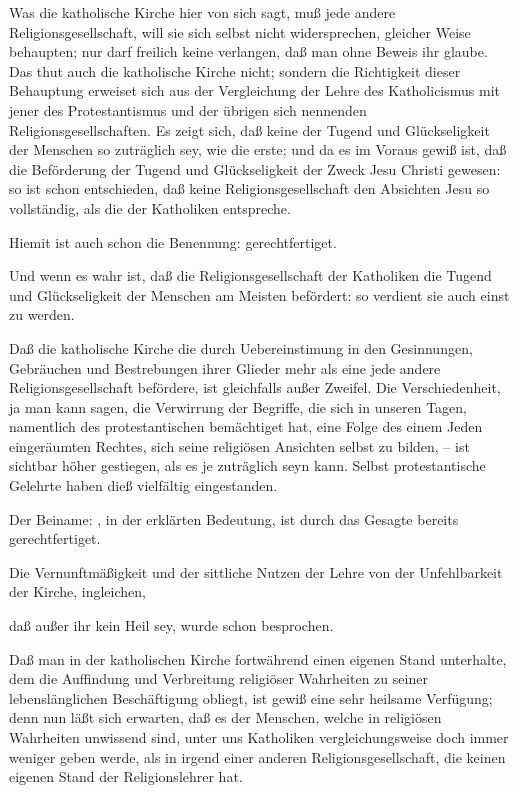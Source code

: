 \begin{aufza}
\item Was die katholische Kirche hier von sich sagt, muß jede andere Religionsgesellschaft, will sie sich selbst nicht widersprechen, gleicher Weise behaupten; nur darf freilich keine verlangen, daß man ohne Beweis ihr glaube. Das thut auch die katholische Kirche nicht; sondern die Richtigkeit dieser Behauptung erweiset sich aus der Vergleichung der Lehre des Katholicismus mit jener des Protestantismus und der übrigen  sich nennenden Religionsgesellschaften. Es zeigt sich, daß keine der Tugend und Glückseligkeit der Menschen so zuträglich sey, wie die erste; und da es im Voraus gewiß ist, daß die Beförderung der Tugend und Glückseligkeit der Zweck Jesu Christi gewesen: so ist schon entschieden, daß keine Religionsgesellschaft den Absichten Jesu so vollständig, als die der Katholiken entspreche.
\item Hiemit ist auch schon die Benennung:  gerechtfertiget.
\item Und wenn es wahr ist, daß die Religionsgesellschaft der Katholiken die Tugend und Glückseligkeit der Menschen am Meisten befördert: so verdient sie auch einst  zu werden.
\item Daß die katholische Kirche die  durch Uebereinstimung in den Gesinnungen, Gebräuchen und Bestrebungen ihrer Glieder mehr als eine jede andere Religionsgesellschaft befördere, ist gleichfalls außer Zweifel. Die Verschiedenheit, ja man kann sagen, die Verwirrung der Begriffe, die sich in unseren Tagen, namentlich des protestantischen  bemächtiget hat, eine Folge des einem Jeden eingeräumten Rechtes, sich seine religiösen Ansichten selbst zu bilden, -- ist sichtbar höher gestiegen, als es je zuträglich seyn kann. Selbst protestantische Gelehrte haben dieß vielfältig eingestanden.
\item Der Beiname: , in der erklärten Bedeutung, ist durch das Gesagte bereits gerechtfertiget.~
\item Die Vernunftmäßigkeit und der sittliche Nutzen der Lehre von der Unfehlbarkeit der Kirche, ingleichen,
\item daß außer ihr kein Heil sey, wurde schon besprochen.
\item Daß man in der katholischen Kirche fortwährend einen eigenen Stand unterhalte, dem die Auffindung und Verbreitung religiöser Wahrheiten zu seiner lebenslänglichen Beschäftigung obliegt, ist gewiß eine sehr heilsame Verfügung; denn nun läßt sich erwarten, daß es der Menschen, welche in religiösen Wahrheiten unwissend sind, unter uns Katholiken vergleichungsweise doch immer weniger geben werde, als in irgend einer anderen Religionsgesellschaft, die keinen eigenen Stand der Religionslehrer hat.

\end{aufza}
